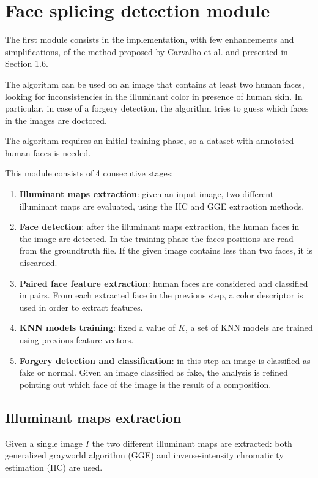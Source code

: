 \section{Face splicing detection module}

The first module consists in the implementation, with few enhancements and simplifications, of the method proposed by Carvalho et al. \cite{carvalho2016illuminant} and presented in Section 1.6.

The algorithm can be used on an image that contains at least two human faces, looking for inconsistencies in the illuminant color in presence of human skin. In particular, in case of a forgery detection, the algorithm tries to guess which faces in the images are doctored.

The algorithm requires an initial training phase, so a dataset with annotated human faces is needed. 

This module consists of 4 consecutive stages:

\begin{enumerate}
\item \textbf{Illuminant maps extraction}: given an input image, two different illuminant maps are evaluated, using the IIC and GGE extraction methods.
\item \textbf{Face detection}: after the illuminant maps extraction, the human faces in the image are detected. In the training phase the faces positions are read from the groundtruth file. If the given image contains less than two faces, it is discarded.
\item \textbf{Paired face feature extraction}: human faces are considered and classified in pairs. From each extracted face in the previous step, a color descriptor is used in order to extract features.
\item \textbf{KNN models training}: fixed a value of $K$, a set of KNN models are trained using previous feature vectors.
\item \textbf{Forgery detection and classification}: in this step an image is classified as fake or normal. Given an image classified as fake, the analysis is refined pointing out which face of the image is the result of a composition.
\end{enumerate}

\subsection{Illuminant maps extraction}

Given a single image $I$ the two different illuminant maps are extracted: both generalized grayworld algorithm (GGE) and inverse-intensity chromaticity estimation (IIC) are used.

